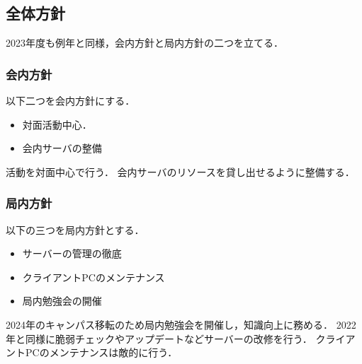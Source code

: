 \subsection*{全体方針}


2023年度も例年と同様，会内方針と局内方針の二つを立てる．

\subsubsection*{会内方針}
以下二つを会内方針にする．
\begin{itemize}
    \item 対面活動中心．
    \item 会内サーバの整備
\end{itemize}
活動を対面中心で行う．
会内サーバのリソースを貸し出せるように整備する．

\subsubsection*{局内方針}
以下の三つを局内方針とする．
\begin{itemize}
    \item サーバーの管理の徹底
    \item クライアントPCのメンテナンス
    \item 局内勉強会の開催
\end{itemize}
2024年のキャンパス移転のため局内勉強会を開催し，知識向上に務める．
2022年と同様に脆弱チェックやアップデートなどサーバーの改修を行う．
クライアントPCのメンテナンスは敵的に行う．
    